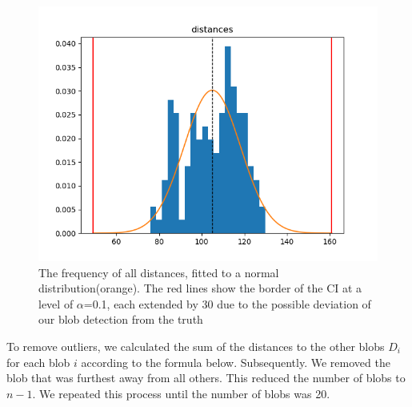 \documentclass[a4paper, 10pt, twocolumn]{article}
\begin{document}
\begin{figure}[ht]
	\centering
  \includegraphics[width=.5\textwidth]{distances_distribution.png}
	\caption{The frequency of all distances, fitted to a normal distribution(orange). The red lines show the border of the CI at a level of $\alpha$=0.1, each extended by 30 due to the possible deviation of our blob detection from the truth} %
	\label{dist_distribution}
\end{figure}
To remove outliers, we calculated the sum of the distances to the other blobs $D_{i}$ for each blob $i$ according to the formula below. Subsequently. We removed the blob that was furthest away from all others. This reduced the number of blobs to $n-1$. We repeated this process until the number of blobs was 20.
\end{document}
